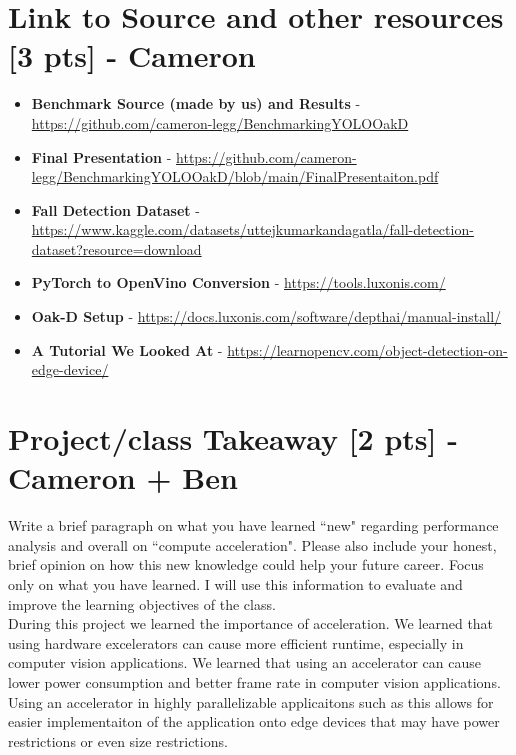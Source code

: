 \documentclass[sigconf,authorversion,nonacm]{acmart}
\begin{document}
\section{Link to Source and other resources {\small {[3 pts]}} - Cameron} 

\begin{itemize}
    \item \textbf{Benchmark Source (made by us) and Results} - \href{https://github.com/cameron-legg/BenchmarkingYOLOOakD}{https://github.com/cameron-legg/BenchmarkingYOLOOakD}
    \item \textbf{Final Presentation} - \href{https://github.com/cameron-legg/BenchmarkingYOLOOakD/blob/main/FinalPresentaiton.pdf}{https://github.com/cameron-legg/BenchmarkingYOLOOakD/blob/main/FinalPresentaiton.pdf}
    \item \textbf{Fall Detection Dataset} - \href{https://www.kaggle.com/datasets/uttejkumarkandagatla/fall-detection-dataset?resource=download}{https://www.kaggle.com/datasets/uttejkumarkandagatla/fall-detection-dataset?resource=download}
    \item \textbf{PyTorch to OpenVino Conversion} - \href{https://tools.luxonis.com/}{https://tools.luxonis.com/}
    \item \textbf{Oak-D Setup} - \href{https://docs.luxonis.com/software/depthai/manual-install/}{https://docs.luxonis.com/software/depthai/manual-install/}
    \item \textbf{A Tutorial We Looked At} - \href{https://learnopencv.com/object-detection-on-edge-device/}{https://learnopencv.com/object-detection-on-edge-device/}
\end{itemize}

\section{Project/class Takeaway {\small {[2 pts]}} - Cameron + Ben}  
Write a brief paragraph on what you have learned ``new" regarding performance analysis and overall on ``compute acceleration". Please also include your honest, brief opinion on how this new knowledge could help your future career. Focus only on what you have learned. I will use this information to evaluate and improve the learning objectives of the class.  \\


During this project we learned the importance of acceleration. We learned that using hardware excelerators can cause more efficient runtime, especially in computer vision applications. We learned that using an accelerator can cause lower power consumption and better frame rate in computer vision applications. Using an accelerator in highly parallelizable applicaitons such as this allows for easier implementaiton of the application onto edge devices that may have power restrictions or even size restrictions.
\end{document}
